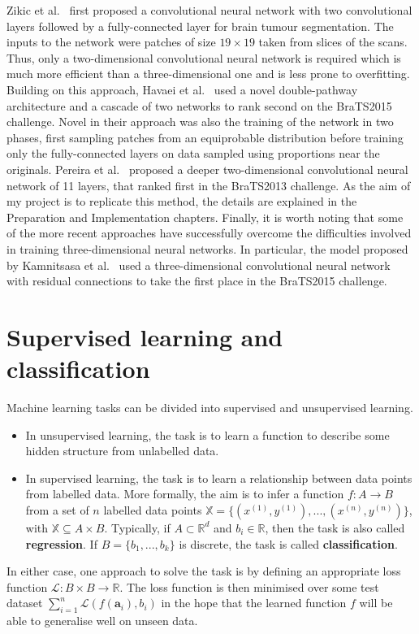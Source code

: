\documentclass[12pt,a4paper,twoside,openright]{report}
\begin{document}
Zikic et al.\ \cite{zikic} first proposed a convolutional neural network with two convolutional layers followed by a fully-connected layer for brain tumour segmentation. The inputs to the network were patches of size $19 \times 19$ taken from slices of the scans. Thus, only a two-dimensional convolutional neural network is required which is much more efficient than a three-dimensional one and is less prone to overfitting. Building on this approach, Havaei et al.\ \cite{havaei} used a novel double-pathway architecture and a cascade of two networks to rank second on the BraTS2015 challenge. Novel in their approach was also the training of the network in two phases, first sampling patches from an equiprobable distribution before training only the fully-connected layers on data sampled using proportions near the originals. Pereira et al.\ \cite{pereira} proposed a deeper two-dimensional convolutional neural network of 11 layers, that ranked first in the BraTS2013 challenge. As the aim of my project is to replicate this method, the details are explained in the Preparation and Implementation chapters. Finally, it is worth noting that some of the more recent approaches have successfully overcome the difficulties involved in training three-dimensional neural networks. In particular, the model proposed by Kamnitsasa et al.\ \cite{kamnitsas} used a three-dimensional convolutional neural network with residual connections \cite{resnet} to take the first place in the BraTS2015 challenge.

\section{Supervised learning and classification}
Machine learning tasks can be divided into supervised and unsupervised learning.
\begin{itemize}
	\item In unsupervised learning, the task is to learn a function to describe some hidden structure from unlabelled data. 
	\item In supervised learning, the task is to learn a relationship between data points from labelled data. More formally, the aim is to infer a function $f: A \to B$ from a set of $n$ labelled data points $\mathbb{X} = \{(x^{(1)}, y^{(1)}), ..., (x^{(n)}, y^{(n)})\}$, with $\mathbb{X} \subseteq A \times B$. Typically, if $A \subset \mathbb{R}^d$ and $b_i \in \mathbb{R}$, then the task is also called \textbf{regression}. If $B = \{b_1, ..., b_k\}$ is discrete, the task is called \textbf{classification}. 
\end{itemize} 
In either case, one approach to solve the task is by defining an appropriate loss function $\mathcal{L}: B \times B \to \mathbb{R}$. The loss function is then minimised over some test dataset $\sum_{i=1}^n \mathcal{L}(f(\textbf{a}_i), b_i)$ in the hope that the learned function $f$ will be able to generalise well on unseen data.
\end{document}
